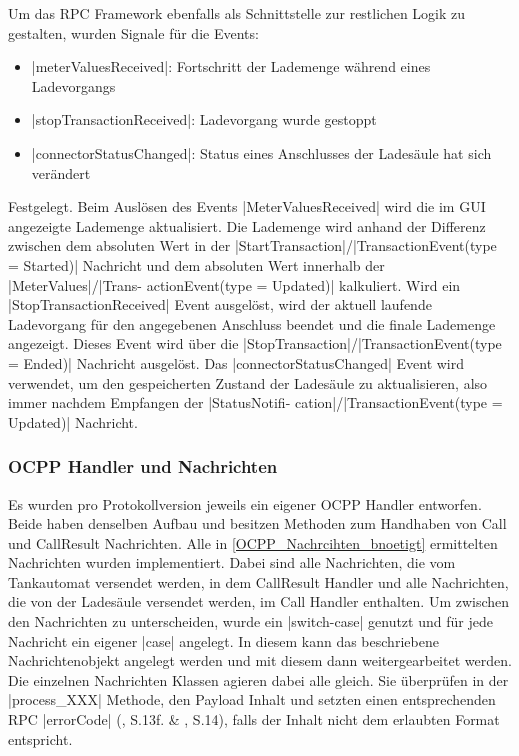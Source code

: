 \noindent Um das RPC Framework ebenfalls als Schnittstelle zur restlichen Logik zu gestalten, wurden Signale für die Events:
\begin{itemize}
	\item \spverb|meterValuesReceived|: Fortschritt der Lademenge während eines Ladevorgangs
	\item \spverb|stopTransactionReceived|: Ladevorgang wurde gestoppt
	\item \spverb|connectorStatusChanged|: Status eines Anschlusses der Ladesäule hat sich verändert
\end{itemize}
Festgelegt. Beim Auslösen des Events \spverb|MeterValuesReceived| wird die im GUI angezeigte Lademenge aktualisiert. Die Lademenge wird anhand der Differenz zwischen dem absoluten Wert in der \spverb|StartTransaction|/\spverb|TransactionEvent(type = Started)| Nachricht und dem absoluten Wert innerhalb der \spverb|MeterValues|/\spverb|Trans- actionEvent(type = Updated)| kalkuliert.
Wird ein \spverb|StopTransactionReceived| Event ausgelöst, wird der aktuell laufende Ladevorgang für den angegebenen Anschluss beendet und die finale Lademenge angezeigt. Dieses Event wird über die \spverb|StopTransaction|/\spverb|TransactionEvent(type = Ended)| Nachricht ausgelöst. Das \spverb|connectorStatusChanged| Event wird verwendet, um den gespeicherten Zustand der Ladesäule zu aktualisieren, also immer nachdem Empfangen der \spverb|StatusNotifi- cation|/\spverb|TransactionEvent(type = Updated)| Nachricht.
\subsubsection{OCPP Handler und Nachrichten}\label{OCPP Probleme Umsetzung}
Es wurden pro Protokollversion jeweils ein eigener OCPP Handler entworfen. Beide haben denselben Aufbau und besitzen Methoden zum Handhaben von Call und CallResult Nachrichten. Alle in \autoref{OCPP_Nachrcihten_bnoetigt} ermittelten Nachrichten wurden implementiert. Dabei sind alle Nachrichten, die vom Tankautomat versendet werden, in dem CallResult Handler und alle Nachrichten, die von der Ladesäule versendet werden, im Call Handler enthalten. Um zwischen den Nachrichten zu unterscheiden, wurde ein \spverb|switch-case| genutzt und für jede Nachricht ein eigener \spverb|case| angelegt. In diesem kann das beschriebene Nachrichtenobjekt angelegt werden und mit diesem dann weitergearbeitet werden.\\

\noindent Die einzelnen Nachrichten Klassen agieren dabei alle gleich. Sie überprüfen in der \spverb|process_XXX| Methode, den Payload Inhalt und setzten einen entsprechenden RPC \spverb|errorCode| (\cite{OCPP-j-1.6-specification}, S.13f. \& \cite{OCPP-2.0.1-part4-ocpp-j-specification}, S.14), falls der Inhalt nicht dem erlaubten Format entspricht.\\

